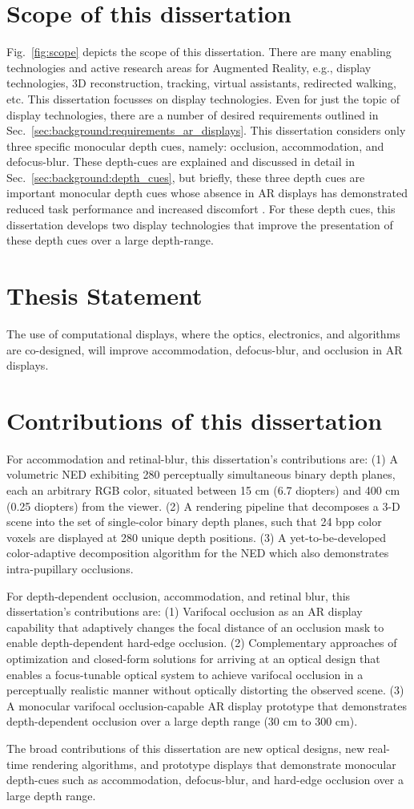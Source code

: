 \section{Scope of this dissertation}

Fig.~\ref{fig:scope} depicts the scope of this dissertation. 
There are many enabling technologies and active research areas for Augmented Reality, e.g., display technologies, 3D reconstruction, tracking, virtual assistants, redirected walking, etc. 
This dissertation focusses on display technologies. 
Even for just the topic of display technologies, there are a number of desired requirements outlined in Sec.~\ref{sec:background:requirements_ar_displays}. 
This dissertation considers only three specific monocular depth cues, namely: occlusion, accommodation, and defocus-blur. 
These depth-cues are explained and discussed in detail in Sec.~\ref{sec:background:depth_cues}, but briefly, these three depth cues are important monocular depth cues whose absence in AR displays has demonstrated reduced task performance and increased discomfort \cite{lambooij2009visual,shibata2011zone,wann1995natural}. 
For these depth cues, this dissertation develops two display technologies that improve the presentation of these depth cues over a large depth-range.

\section{Thesis Statement}
The use of computational displays, where the optics, electronics, and algorithms are co-designed, will improve accommodation, defocus-blur, and occlusion in AR displays.

\section{Contributions of this dissertation}
For accommodation and retinal-blur, this dissertation’s contributions are: 
(1) A volumetric NED exhibiting 280 perceptually simultaneous binary depth planes, each an arbitrary RGB color, situated between 15 cm (6.7 diopters) and 400 cm (0.25 diopters) from the viewer. 
(2) A rendering pipeline that decomposes a 3-D scene into the set of single-color binary depth planes, such that 24 bpp color voxels are displayed at 280 unique depth positions. 
(3) A yet-to-be-developed color-adaptive decomposition algorithm for the NED which also demonstrates intra-pupillary occlusions. 

For depth-dependent occlusion, accommodation, and retinal blur, this dissertation’s contributions are: 
(1) Varifocal occlusion as an AR display capability that adaptively changes the focal distance of an occlusion mask to enable depth-dependent hard-edge occlusion. 
(2) Complementary approaches of optimization and closed-form solutions for arriving at an optical design that enables a focus-tunable optical system to achieve varifocal occlusion in a perceptually realistic manner without optically distorting the observed scene. 
(3) A monocular varifocal occlusion-capable AR display prototype that demonstrates depth-dependent occlusion over a large depth range (30 cm to 300 cm). 

The broad contributions of this dissertation are new optical designs, new real-time rendering algorithms, and prototype displays that demonstrate monocular depth-cues such as accommodation, defocus-blur, and hard-edge occlusion over a large depth range. 

